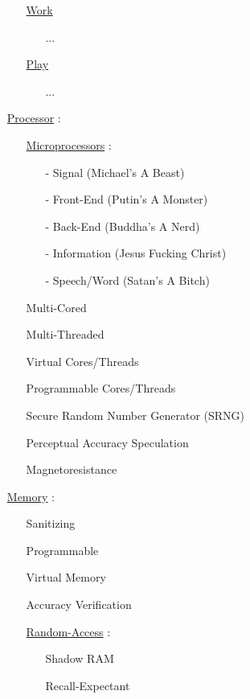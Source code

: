 \documentclass[11pt]{article}
\begin{document}
\begin{enumerate}
\begin{enumerate}
		\item[] \ul{Work}
		\begin{enumerate}
			\item[] ...
		\end{enumerate}
	
		\item[] \ul{Play}
		\begin{enumerate}
			\item[] ...
		\end{enumerate}
	
	\end{enumerate}

	\item[] \ul{Processor} :
	\begin{enumerate}
		\item[] \ul{Microprocessors} :
		\begin{enumerate}
			\item[-] Signal (Michael's A Beast)
			\item[-] Front-End (Putin's A Monster)
			\item[-] Back-End (Buddha's A Nerd)
			\item[-] Information (Jesus Fucking Christ)
			\item[-] Speech/Word (Satan's A Bitch)
		\end{enumerate}
	
		\item[] Multi-Cored
		\item[] Multi-Threaded
		\item[] Virtual Cores/Threads
		\item[] Programmable Cores/Threads
		\item[] Secure Random Number Generator (SRNG)
		\item[] Perceptual Accuracy Speculation
		\item[] Magnetoresistance
		
	\end{enumerate}
	
	\item[] \ul{Memory} :
	\begin{enumerate}
		\item[] Sanitizing
		\item[] Programmable
		\item[] Virtual Memory
		\item[] Accuracy Verification
	
		\item[] \ul{Random-Access} :
		\begin{enumerate}
			\item[] Shadow RAM
			\item[] Recall-Expectant
		\end{enumerate}
	\end{enumerate}


\end{enumerate}
\end{document}
